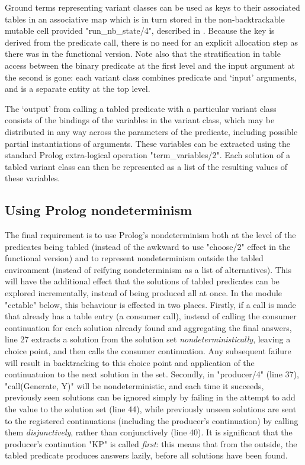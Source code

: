 Ground terms representing variant classes can be
used as keys to their associated tables in an associative map which is in turn stored in
the non-backtrackable mutable cell provided "run_nb_state/4", described in .
Because the key is derived from the predicate call, there is no need
for an explicit allocation step as there was in the functional version. Note also that the
stratification in table access between the binary predicate at the first level
and the input argument at the second is gone: each variant class combines predicate
and `input' arguments, and is a separate entity at the top level.

The `output' from calling a tabled predicate with a particular variant class consists of
the bindings of the variables in the variant class, which may be distributed in any
way across the parameters of the predicate, including possible partial instantiations
of arguments. These variables can be extracted using the standard Prolog extra-logical
operation "term_variables/2". Each solution of a tabled variant class can then be represented
as a list of the resulting values of these variables.

\subsection{Using Prolog nondeterminism}

The final requirement is to use Prolog's nondeterminism both at the level of the predicates
being tabled (instead of the awkward to use "choose/2" effect in the functional version)
and to represent nondeterminism outside the tabled environment (instead of reifying nondeterminism
as a list of alternatives). This will have the additional effect that the solutions of tabled
predicates can be explored incrementally, instead of being produced all at once.
In the module "cctable" below, this behaviour is effected in two places. Firstly, if a call is made
that already has a table entry (\ie a consumer call), instead of calling the consumer continuation
for each solution already found and aggregating the final answers, line 27 extracts a solution
from the solution set \emph{nondeterministically}, leaving a choice point, and then calls
the consumer continuation. Any subsequent failure will result in backtracking to this choice
point and application of the continuatuion to the next solution in the set.
Secondly, in "producer/4" (line 37), "call(Generate, Y)" will be nondeterministic, and each time it succeeds,
previously seen solutions can be ignored simply by failing in the attempt to add the value to the 
solution set (line 44),
while previously unseen solutions are sent to the registered continuations (including the producer's
continuation) by calling them \emph{disjunctively}, rather than conjunctively (line 40). It is significant that
the producer's continution "KP" is called \emph{first}: this means that from the outside,
the tabled predicate produces answers lazily, before all solutions have been found.

